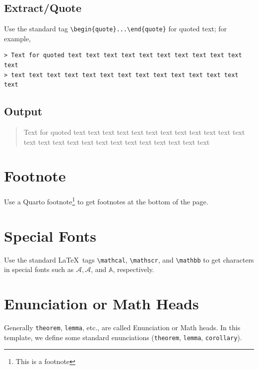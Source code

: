 \documentclass[]{imag-ms-template}
\theoremstyle{plain}
\theoremstyle{remark}
\begin{document}
\subsection*{Extract/Quote}\label{extractquote}

Use the standard tag \verb!\begin{quote}...\end{quote}! for quoted text;
for example,

\begin{verbatim}
> Text for quoted text text text text text text text text text text text
> text text text text text text text text text text text text text text 
\end{verbatim}

\subsection*{Output}\label{output-4}

\begin{quote}
Text for quoted text text text text text text text text text text text
text text text text text text text text text text text text text text
\end{quote}

\section{Footnote}\label{footnote}

Use a Quarto footnote\footnote{This is a footnote} to get footnotes at
the bottom of the page.

\section{Special Fonts}\label{special-fonts}

Use the standard \LaTeX~tags \verb!\mathcal!, \verb!\mathscr!, and
\verb!\mathbb! to get characters in special fonts such as
\(\mathcal{A}, \mathscr{A}\), and \(\mathbb{A}\), respectively.

\section{Enunciation or Math Heads}\label{enunciation-or-math-heads}

Generally \verb!theorem!, \verb!lemma!, etc., are called Enunciation or
Math heads. In this template, we define some standard enunciations
(\verb!theorem!, \verb!lemma!, \verb!corollary!).
\end{document}
